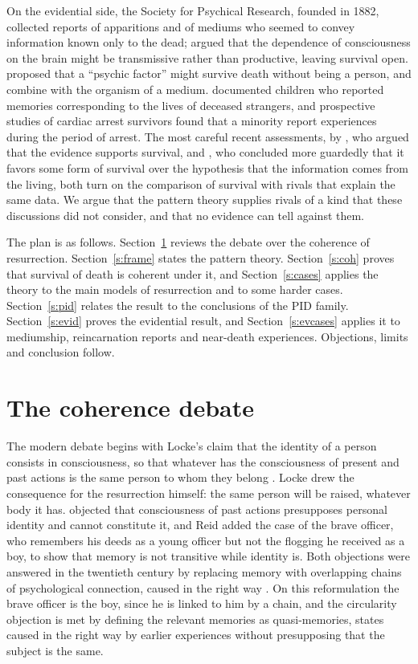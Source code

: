 \documentclass{situationist-preprint}
\begin{document}
On the evidential side, the Society for Psychical Research, founded in 1882, collected reports of apparitions and of mediums who seemed to convey information known only to the dead; \citet{James1898} argued that the dependence of consciousness on the brain might be transmissive rather than productive, leaving survival open. \citet{Broad1925} proposed that a \enquote{psychic factor} might survive death without being a person, and combine with the organism of a medium. \citet{Stevenson1974} documented children who reported memories corresponding to the lives of deceased strangers, and prospective studies of cardiac arrest survivors \citep{vanLommel2001} found that a minority report experiences during the period of arrest. The most careful recent assessments, by \citet{Almeder1992}, who argued that the evidence supports survival, and \citet{Braude2003}, who concluded more guardedly that it favors some form of survival over the hypothesis that the information comes from the living, both turn on the comparison of survival with rivals that explain the same data. We argue that the pattern theory supplies rivals of a kind that these discussions did not consider, and that no evidence can tell against them.

The plan is as follows. Section~\ref{s:history} reviews the debate over the coherence of resurrection. Section~\ref{s:frame} states the pattern theory. Section~\ref{s:coh} proves that survival of death is coherent under it, and Section~\ref{s:cases} applies the theory to the main models of resurrection and to some harder cases. Section~\ref{s:pid} relates the result to the conclusions of the PID family. Section~\ref{s:evid} proves the evidential result, and Section~\ref{s:evcases} applies it to mediumship, reincarnation reports and near-death experiences. Objections, limits and conclusion follow.

\section{The coherence debate}\label{s:history}

The modern debate begins with Locke's claim that the identity of a person consists in consciousness, so that whatever has the consciousness of present and past actions is the same person to whom they belong \citep[II.xxvii.10]{Locke1694}. Locke drew the consequence for the resurrection himself: the same person will be raised, whatever body it has. \citet{Butler1736} objected that consciousness of past actions presupposes personal identity and cannot constitute it, and Reid added the case of the brave officer, who remembers his deeds as a young officer but not the flogging he received as a boy, to show that memory is not transitive while identity is. Both objections were answered in the twentieth century by replacing memory with overlapping chains of psychological connection, caused in the right way \citep{Shoemaker1984,Parfit1984}. On this reformulation the brave officer is the boy, since he is linked to him by a chain, and the circularity objection is met by defining the relevant memories as quasi-memories, states caused in the right way by earlier experiences without presupposing that the subject is the same.
\end{document}
